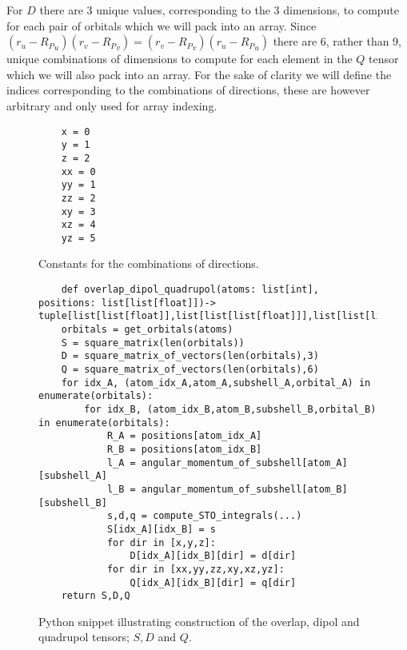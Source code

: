 For $D$ there are 3 unique values, corresponding to the 3 dimensions, to compute for each pair of orbitals which we will pack into an array. 
Since $(r_u-{R_P}_u)(r_v-{R_P}_v)=(r_v-{R_P}_v)(r_u-{R_P}_u)$ there are 6, rather than 9, unique combinations of dimensions to compute for each element in the $Q$ tensor which we will also pack into an array.
For the sake of clarity we will define the indices corresponding to the combinations of directions, these are however arbitrary and only used for array indexing.  
\begin{figure}[H]
\begin{verbatim}
    x = 0
    y = 1
    z = 2
    xx = 0
    yy = 1
    zz = 2
    xy = 3
    xz = 4
    yz = 5
\end{verbatim}
\caption{Constants for the combinations of directions.}
\end{figure}
\begin{figure}[H]
\begin{verbatim}
    def overlap_dipol_quadrupol(atoms: list[int], positions: list[list[float]])-> tuple[list[list[float]],list[list[list[float]]],list[list[list[float]]]]:
    orbitals = get_orbitals(atoms)
    S = square_matrix(len(orbitals))
    D = square_matrix_of_vectors(len(orbitals),3)
    Q = square_matrix_of_vectors(len(orbitals),6)
    for idx_A, (atom_idx_A,atom_A,subshell_A,orbital_A) in enumerate(orbitals):
        for idx_B, (atom_idx_B,atom_B,subshell_B,orbital_B) in enumerate(orbitals):
            R_A = positions[atom_idx_A]
            R_B = positions[atom_idx_B]
            l_A = angular_momentum_of_subshell[atom_A][subshell_A]
            l_B = angular_momentum_of_subshell[atom_B][subshell_B]
            s,d,q = compute_STO_integrals(...)
            S[idx_A][idx_B] = s
            for dir in [x,y,z]:
                D[idx_A][idx_B][dir] = d[dir]
            for dir in [xx,yy,zz,xy,xz,yz]:
                Q[idx_A][idx_B][dir] = q[dir]
    return S,D,Q
\end{verbatim}
\caption{Python snippet illustrating construction of the overlap, dipol and quadrupol tensors; $S,D$ and $Q$.}
\end{figure}

